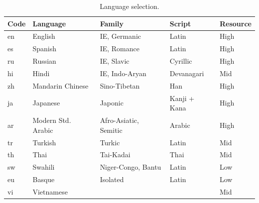 \documentclass{article}
\begin{document}
\begin{table}[ht]
\centering
\small
\setlength{\tabcolsep}{5pt}
\caption{Language selection.}
\label{tab:languages}
\begin{tabular}{lllll}
\toprule
Code & Language & Family & Script & Resource \\ %
\midrule
en & English                & IE, Germanic           & Latin           & High \\ %
es & Spanish                & IE, Romance            & Latin           & High \\ %
ru & Russian                & IE, Slavic             & Cyrillic        & High \\ %
hi & Hindi                  & IE, Indo-Aryan         & Devanagari      & Mid \\ %
zh & Mandarin Chinese       & Sino-Tibetan           & Han             & High \\ %
ja & Japanese               & Japonic                & Kanji + Kana    & High \\ %
ar & Modern Std. Arabic & Afro-Asiatic, Semitic  & Arabic          & High \\ %
tr & Turkish                & Turkic                 & Latin           & Mid \\ %
th & Thai                   & Tai-Kadai              & Thai            & Mid \\ %
sw & Swahili                & Niger-Congo, Bantu     & Latin           & Low \\ %
eu & Basque & Isolated & Latin & Low \\
vi & Vietnamese & & & Mid \\
\bottomrule
\end{tabular}
\end{table}
\end{document}
